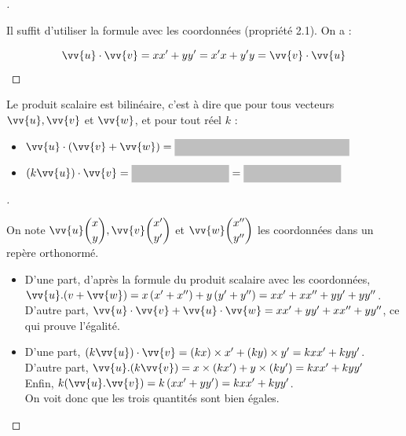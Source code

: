 \documentclass[12pt]{article}
\theoremstyle{break}
\newenvironment{demo}[1][\proofname]{%
  \begin{proof}[#1]$ $\newline
  }{%
  \end{proof}
}
\begin{document}
\begin{demo}
  Il suffit d'utiliser la formule avec les coordonnées (propriété 2.1). On a :

  $$
  \vv{u} \cdot \vv{v}=x x^{\prime}+y y^{\prime}=x^{\prime} x+y^{\prime} y=\vv{v} \cdot \vv{u}
  $$
\end{demo}

\begin{proposition}{}{}
  Le produit scalaire est bilinéaire, c'est à dire que pour tous vecteurs $\vv{u}, \vv{v}$ et $\vv{w}$, et pour tout réel $k$ :

  \begin{itemize}
    \item $\vv{u} \cdot(\vv{v}+\vv{w})=\hideM{\vv{u} \cdot \vv{v}+\vv{u} \cdot \vv{w}}$
    \item $(k \vv{u}) \cdot \vv{v}=\hideM{\vv{u} \cdot(k \vv{v})} =\hideM{k(\vv{u} \cdot \vv{v})}$
  \end{itemize}
\end{proposition}

\begin{demo}
  On note $\vv{u}\dbinom{x}{y}, \vv{v}\dbinom{x^{\prime}}{y^{\prime}}$ et $\vv{w}\dbinom{x^{\prime \prime}}{y^{\prime \prime}}$ les coordonnées dans un repère orthonormé.

  \begin{itemize}
    \item D'une part, d'après la formule du produit scalaire avec les coordonnées, $\vv{u} .(v+\vv{w})=x\left(x^{\prime}+x^{\prime \prime}\right)+y\left(y^{\prime}+y^{\prime \prime}\right)=x x^{\prime}+x x^{\prime \prime}+y y^{\prime}+y y^{\prime \prime}$.\\
      D'autre part, $\vv{u} \cdot \vv{v}+\vv{u} \cdot \vv{w}=x x^{\prime}+y y^{\prime}+x x^{\prime \prime}+y y^{\prime \prime}$, ce qui prouve l'égalité.
    \item D'une part, $(k \vv{u}) \cdot \vv{v}=(k x) \times x^{\prime}+(k y) \times y^{\prime}=k x x^{\prime}+k y y^{\prime}$.\\
      D'autre part, $\vv{u} .(k \vv{v})=x \times\left(k x^{\prime}\right)+y \times\left(k y^{\prime}\right)=k x x^{\prime}+k y y^{\prime}$\\
      Enfin, $k(\vv{u} . \vv{v})=k\left(x x^{\prime}+y y^{\prime}\right)=k x x^{\prime}+k y y^{\prime}$.\\
      On voit donc que les trois quantités sont bien égales.
  \end{itemize}
\end{demo}
\end{document}

